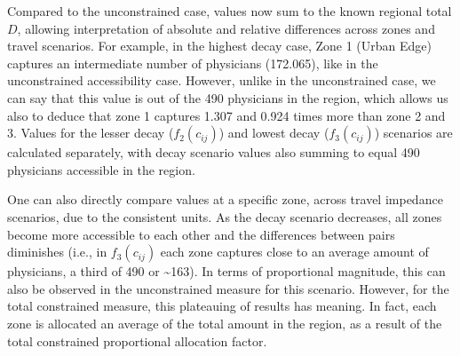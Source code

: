 \documentclass[
  10pt,
  letterpaper,
]{article}
\begin{document}
\begin{table}

\caption{\label{tbl-simple-example-total-opportunity-accessibility}Simple
system: total constrained accessible opportunities.}


\end{table}%

Compared to the unconstrained case, values now sum to the known regional
total \(D\), allowing interpretation of absolute and relative
differences across zones and travel scenarios. For example, in the
highest decay case, Zone 1 (Urban Edge) captures an intermediate number
of physicians (172.065), like in the unconstrained accessibility case.
However, unlike in the unconstrained case, we can say that this value is
out of the 490 physicians in the region, which allows us also to deduce
that zone 1 captures 1.307 and 0.924 times more than zone 2 and 3.
Values for the lesser decay (\(f_2(c_{ij})\)) and lowest decay
(\(f_3(c_{ij})\)) scenarios are calculated separately, with decay
scenario values also summing to equal 490 physicians accessible in the
region.

One can also directly compare values at a specific zone, across travel
impedance scenarios, due to the consistent units. As the decay scenario
decreases, all zones become more accessible to each other and the
differences between pairs diminishes (i.e., in \(f_3(c_{ij})\) each zone
captures close to an average amount of physicians, a third of 490 or
\textasciitilde163). In terms of proportional magnitude, this can also
be observed in the unconstrained measure for this scenario. However, for
the total constrained measure, this plateauing of results has meaning.
In fact, each zone is allocated an average of the total amount in the
region, as a result of the total constrained proportional allocation
factor.
\end{document}
